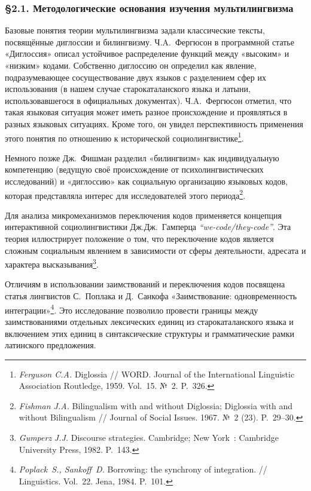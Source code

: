 \subsubsection*{§2.1. Методологические основания изучения мультилингвизма}

Базовые понятия теории мультилингвизма задали классические тексты, посвящённые диглоссии и билингвизму. Ч.A.~Фергюсон в программной статье «Диглоссия» описал устойчивое распределение функций между «высоким» и «низким» кодами. Собственно диглоссию он определил как явление, подразумевающее сосуществование двух языков с разделением сфер их использования (в нашем случае старокаталанского языка и латыни, использовавшегося в официальных документах). Ч.A.~Фергюсон отметил, что такая языковая ситуация может иметь разное происхождение и проявляться в разных языковых ситуациях. Кроме того, он увидел перспективность применения этого понятия по отношению к исторической социолингвистике\footnote{\emph{Ferguson C.A.} Diglossia // WORD. Journal of the International Linguistic Association Routledge, 1959. Vol.~15. №~2. P.~326.}.

Немного позже Дж.~Фишман разделил «билингвизм» как индивидуальную компетенцию (ведущую своё происхождение от психолингвистических исследований) и «диглоссию» как социальную организацию языковых кодов, которая представляла интерес для исследователей этого периода\footnote{\emph{Fishman J.A. }Bilingualism with and without Diglossia; Diglossia with and without Bilingualism // Journal of Social Issues. 1967. №~2 (23). P.~29--30.}.

Для анализа микромеханизмов переключения кодов применяется концепция интерактивной социолингвистики Дж.Дж.~Гамперца \emph{“}\emph{we-code}\emph{/}\emph{they-code}\emph{”}. Эта теория иллюстрирует положение о том, что переключение кодов является сложным социальным явлением в зависимости от сферы деятельности, адресата и характера высказывания\footnote{\emph{Gumperz}\emph{ J.J.} Discourse strategies. Cambridge; New York~: Cambridge University Press, 1982. P.~143.}.

Отличиям в использовании заимствований и переключения кодов посвящена статья лингвистов С.~Поплака и Д.~Санкофа «Заимствование: одновременность интеграции»\footnote{\emph{Poplack}\emph{~S., Sankoff~D.} Borrowing: the synchrony of integration. // Linguistics. Vol.~22. Jena, 1984. P.~101.}. Это исследование позволило провести границы между заимствованиями отдельных лексических единиц из старокаталанского языка и включением этих единиц в синтаксические структуры и грамматические рамки латинского предложения.

